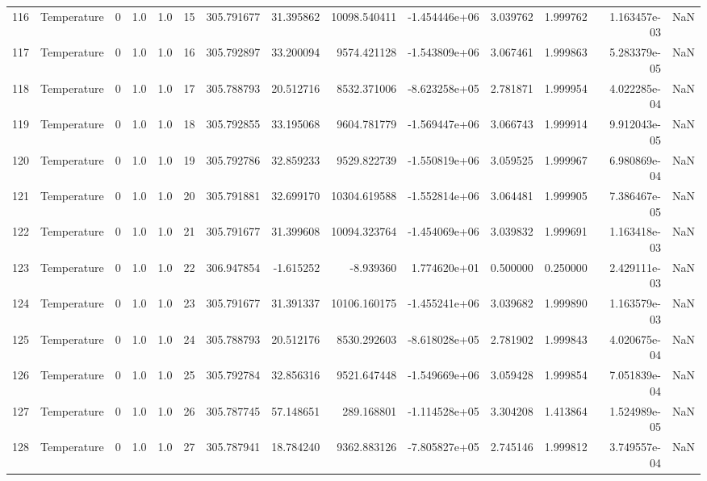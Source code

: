 \begin{tabular}{llrrrrrrrrrrrr}
116 &  Temperature &       0 &  1.0 &  1.0 &   15 &  305.791677 &    31.395862 &   10098.540411 & -1.454446e+06 &  3.039762 &  1.999762 &  1.163457e-03 &      NaN \\
117 &  Temperature &       0 &  1.0 &  1.0 &   16 &  305.792897 &    33.200094 &    9574.421128 & -1.543809e+06 &  3.067461 &  1.999863 &  5.283379e-05 &      NaN \\
118 &  Temperature &       0 &  1.0 &  1.0 &   17 &  305.788793 &    20.512716 &    8532.371006 & -8.623258e+05 &  2.781871 &  1.999954 &  4.022285e-04 &      NaN \\
119 &  Temperature &       0 &  1.0 &  1.0 &   18 &  305.792855 &    33.195068 &    9604.781779 & -1.569447e+06 &  3.066743 &  1.999914 &  9.912043e-05 &      NaN \\
120 &  Temperature &       0 &  1.0 &  1.0 &   19 &  305.792786 &    32.859233 &    9529.822739 & -1.550819e+06 &  3.059525 &  1.999967 &  6.980869e-04 &      NaN \\
121 &  Temperature &       0 &  1.0 &  1.0 &   20 &  305.791881 &    32.699170 &   10304.619588 & -1.552814e+06 &  3.064481 &  1.999905 &  7.386467e-05 &      NaN \\
122 &  Temperature &       0 &  1.0 &  1.0 &   21 &  305.791677 &    31.399608 &   10094.323764 & -1.454069e+06 &  3.039832 &  1.999691 &  1.163418e-03 &      NaN \\
123 &  Temperature &       0 &  1.0 &  1.0 &   22 &  306.947854 &    -1.615252 &      -8.939360 &  1.774620e+01 &  0.500000 &  0.250000 &  2.429111e-03 &      NaN \\
124 &  Temperature &       0 &  1.0 &  1.0 &   23 &  305.791677 &    31.391337 &   10106.160175 & -1.455241e+06 &  3.039682 &  1.999890 &  1.163579e-03 &      NaN \\
125 &  Temperature &       0 &  1.0 &  1.0 &   24 &  305.788793 &    20.512176 &    8530.292603 & -8.618028e+05 &  2.781902 &  1.999843 &  4.020675e-04 &      NaN \\
126 &  Temperature &       0 &  1.0 &  1.0 &   25 &  305.792784 &    32.856316 &    9521.647448 & -1.549669e+06 &  3.059428 &  1.999854 &  7.051839e-04 &      NaN \\
127 &  Temperature &       0 &  1.0 &  1.0 &   26 &  305.787745 &    57.148651 &     289.168801 & -1.114528e+05 &  3.304208 &  1.413864 &  1.524989e-05 &      NaN \\
128 &  Temperature &       0 &  1.0 &  1.0 &   27 &  305.787941 &    18.784240 &    9362.883126 & -7.805827e+05 &  2.745146 &  1.999812 &  3.749557e-04 &      NaN \\

\end{tabular}
